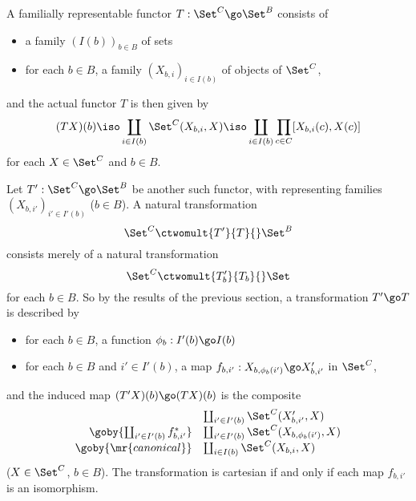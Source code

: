 A familially representable functor $T: \Set^C \go \Set^B$ consists of 
%
\begin{itemize}
\item a family $(I(b))_{b\in B}$ of sets
\item for each $b\in B$, a family $(X_{b,i})_{i\in I(b)}$ of objects of
$\Set^C$, 
\end{itemize}
%
and the actual functor $T$ is then given by 
\[
(TX)(b) 
\iso
\coprod_{i\in I(b)} \Set^C(X_{b,i}, X) 
\iso
\coprod_{i\in I(b)} \prod_{c \in C} [X_{b,i}(c), X(c)]
\]
for each $X\in \Set^C$ and $b\in B$.

Let $T': \Set^C \go \Set^B$ be another such functor, with representing
families $(X_{b,i'})_{i'\in I'(b)}$ ($b\in B$).  A natural transformation%
%
%
\[
\Set^C \ctwomult{T'}{T}{} \Set^B
\]
consists merely of a natural transformation
\[
\Set^C \ctwomult{T'_b}{T_b}{} \Set
\]
for each $b\in B$.  So by the results of the previous section, a
transformation $T' \go T$ is described by
%
\begin{itemize}
\item for each $b\in B$, a function $\phi_b: I'(b) \go I(b)$
\item for each $b\in B$ and $i' \in I'(b)$, a map 
$
f_{b,i'}: X_{b, \phi_b(i')} \go X'_{b,i'}
$
in $\Set^C$,
\end{itemize}
%
and the induced map $(T'X)(b) \go (TX)(b)$ is the composite
\[
\begin{array}{rl}
						&
\coprod_{i'\in I'(b)} \Set^C (X'_{b,i'}, X)	\\
\goby{\coprod_{i'\in I'(b)} f_{b,i'}^*}		&
\coprod_{i'\in I'(b)} \Set^C (X_{b, \phi_b(i')}, X)	\\
\goby{\mr{canonical}}				&
\coprod_{i\in I(b)} \Set^C (X_{b,i}, X)
\end{array}
\]
($X\in \Set^C$, $b\in B$).  The transformation is cartesian%
%
%
if and only if
each map $f_{b,i'}$ is an isomorphism.

